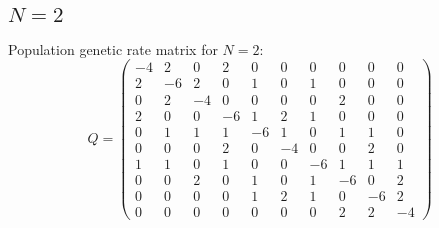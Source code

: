 \documentclass{article}
\theoremstyle{plain}
\theoremstyle{definition}
\begin{document}
\subsection{$N = 2$}

Population genetic rate matrix for $N = 2$:
\begin{equation}
	Q =
	\begin{pmatrix}
		-4 & 2 & 0 & 2 & 0 & 0 & 0 & 0 & 0 & 0 \\
		2 & -6 & 2 & 0 & 1 & 0 & 1 & 0 & 0 & 0 \\
		0 & 2 & -4 & 0 & 0 & 0 & 0 & 2 & 0 & 0 \\
		2 & 0 & 0 & -6 & 1 & 2 & 1 & 0 & 0 & 0 \\
		0 & 1 & 1 & 1 & -6 & 1 & 0 & 1 & 1 & 0 \\
		0 & 0 & 0 & 2 & 0 & -4 & 0 & 0 & 2 & 0 \\
		1 & 1 & 0 & 1 & 0 & 0 & -6 & 1 & 1 & 1 \\
		0 & 0 & 2 & 0 & 1 & 0 & 1 & -6 & 0 & 2 \\
		0 & 0 & 0 & 0 & 1 & 2 & 1 & 0 & -6 & 2 \\
		0 & 0 & 0 & 0 & 0 & 0 & 0 & 2 & 2 & -4
	\end{pmatrix}
\end{equation}
\end{document}
